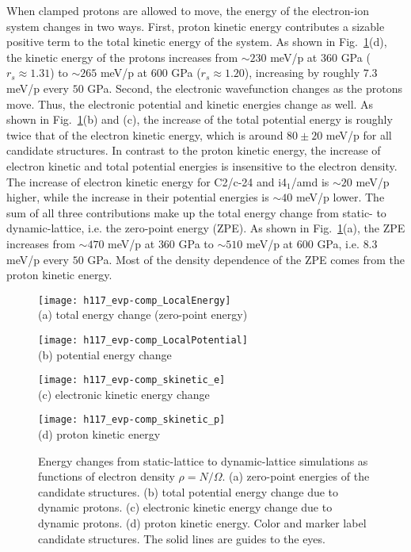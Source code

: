 When clamped protons are allowed to move, the energy of the electron-ion system changes in two ways.
First, proton kinetic energy contributes a sizable positive term to the total kinetic energy of the system. As shown in Fig.~\ref{fig:hsolid-ion-energy}(d), the kinetic energy of the protons increases from $\sim 230$ meV/p at $360$ GPa ($r_s\approx 1.31$) to $\sim 265$ meV/p at $600$ GPa ($r_s\approx 1.20$), increasing by roughly $7.3$ meV/p every $50$ GPa.
Second, the electronic wavefunction changes as the protons move. Thus, the electronic potential and kinetic energies change as well.
As shown in Fig.~\ref{fig:hsolid-ion-energy}(b) and (c), the increase of the total potential energy is roughly twice that of the electron kinetic energy, which is around $80\pm20$ meV/p for all candidate structures.
In contrast to the proton kinetic energy, the increase of electron kinetic and total potential energies is insensitive to the electron density.
The increase of electron kinetic energy for C2/c-24 and i4$_1$/amd is $\sim 20$ meV/p higher, while the increase in their potential energies is $\sim 40$ meV/p lower.
The sum of all three contributions make up the total energy change from static- to dynamic-lattice, i.e. the zero-point energy (ZPE).
As shown in Fig.~\ref{fig:hsolid-ion-energy}(a), the ZPE increases from $\sim 470$ meV/p at $360$ GPa to $\sim 510$ meV/p at $600$ GPa, i.e. $8.3$ meV/p every $50$ GPa.
Most of the density dependence of the ZPE comes from the proton kinetic energy.

\begin{figure}[h]
\centering
\begin{minipage}{0.49\textwidth}
\centering
\texttt{[image: h117\_evp-comp\_LocalEnergy]}\\
(a) total energy change (zero-point energy)
\end{minipage}
\begin{minipage}{0.49\textwidth}
\centering
\texttt{[image: h117\_evp-comp\_LocalPotential]}\\
(b) potential energy change
\end{minipage}
\begin{minipage}{0.49\textwidth}
\centering
\texttt{[image: h117\_evp-comp\_skinetic\_e]}\\
(c) electronic kinetic energy change
\end{minipage}
\begin{minipage}{0.49\textwidth}
\centering
\texttt{[image: h117\_evp-comp\_skinetic\_p]}\\
(d) proton kinetic energy
\end{minipage}
\caption{Energy changes from static-lattice to dynamic-lattice simulations as functions of electron density $\rho=N/\Omega$. (a) zero-point energies of the candidate structures. (b) total potential energy change due to dynamic protons. (c) electronic kinetic energy change due to dynamic protons. (d) proton kinetic energy. Color and marker label candidate structures. The solid lines are guides to the eyes.}
\label{fig:hsolid-ion-energy}
\end{figure}

